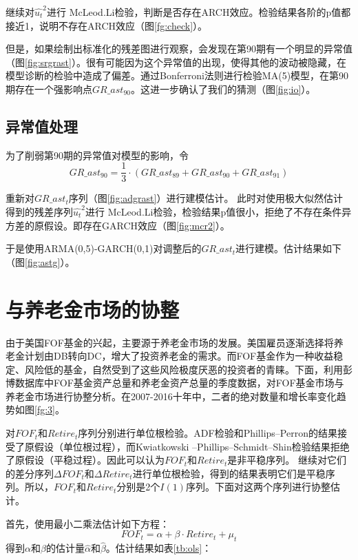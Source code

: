 \documentclass[10.5pt,onecolumn,a4paper]{article}%
\begin{document}
继续对$\hat{u_t}^2$进行 McLeod.Li检验，判断是否存在ARCH效应。检验结果各阶的p值都接近1，说明不存在ARCH效应（图\ref{fg:check}）。



但是，如果绘制出标准化的残差图进行观察，会发现在第90期有一个明显的异常值（图\ref{fig:srgrast}）。很有可能因为这个异常值的出现，使得其他的波动被隐藏，在模型诊断的检验中造成了偏差。通过Bonferroni法则进行检验MA(5)模型，在第90期存在一个强影响点$GR\_ast_{90}$。这进一步确认了我们的猜测（图\ref{fig:io}）。



\subsection{异常值处理}
为了削弱第90期的异常值对模型的影响，令
$$GR\_ast_{90} = \frac{1}{3} \cdot (GR\_ast_{89}+GR\_ast_{90}+GR\_ast_{91})$$


重新对${GR\_ast_t}$序列（图\ref{fig:adgrast}）进行建模估计。
此时对使用极大似然估计得到的残差序列${\hat{u_t}^2}$进行 McLeod.Li检验，检验结果p值很小，拒绝了不存在条件异方差的原假设。即存在GARCH效应（图\ref{fig:mcr2}）。



于是使用ARMA(0,5)-GARCH(0,1)对调整后的${GR\_ast_{t}}$进行建模。估计结果如下（图\ref{fig:astg}）。


\section{与养老金市场的协整}
由于美国FOF基金的兴起，主要源于养老金市场的发展。美国雇员逐渐选择将养老金计划由DB转向DC，增大了投资养老金的需求。而FOF基金作为一种收益稳定、风险低的基金，自然受到了这些风险极度厌恶的投资者的青睐。下面，利用彭博数据库中FOF基金资产总量和养老金资产总量的季度数据，对FOF基金市场与养老金市场进行协整分析。在2007-2016十年中，二者的绝对数量和增长率变化趋势如图\ref{fg:3}。


对${FOF_t}$和${Retire_t}$序列分别进行单位根检验。ADF检验和Phillips–Perron的结果接受了原假设（单位根过程），而Kwiatkowski –Phillips–Schmidt–Shin检验结果拒绝了原假设（平稳过程）。因此可以认为${FOF_t}$和${Retire_t}$是非平稳序列。
继续对它们的差分序列${\Delta FOF_t}$和${\Delta Retire_t}$进行单位根检验，得到的结果表明它们是平稳序列。所以，${FOF_t}$和${Retire_t}$分别是2个$I(1)$序列。下面对这两个序列进行协整估计。

首先，使用最小二乘法估计如下方程：
$$FOF_t = \alpha + \beta \cdot Retire_t + \mu_t$$
得到$\alpha$和$\beta$的估计量$\hat{\alpha}$和$\hat{\beta}$。估计结果如表\ref{tb:ols}：
\end{document}
